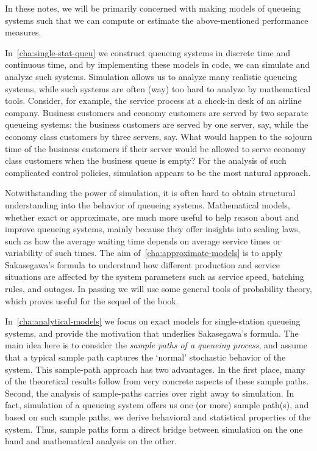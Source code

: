 In these notes, we will be primarily concerned with making models of queueing systems such that we can compute or estimate the above-mentioned performance measures.

In~\cref{cha:single-stat-queu} we construct queueing systems in discrete time and continuous time, and by implementing these models in code, we can simulate and analyze such systems.
Simulation allows us to analyze many realistic queueing systems, while such systems are often (way) too hard to analyze by mathematical tools.
Consider, for example, the service process at a check-in desk of an airline company.
Business customers and economy customers are served by two separate queueing systems: the business customers are served by one server, say, while the economy class customers by three servers, say.
What would happen to the sojourn time of the business customers if their server would be allowed to serve economy class customers when the business queue is empty?
For the analysis of such complicated control policies, simulation appears to be the most natural approach.

Notwithstanding the power of simulation, it is often hard to obtain structural understanding into the behavior of queueing systems.
Mathematical models, whether exact or approximate, are much more useful to help reason about and improve queueing systems, mainly because they offer insights into scaling laws, such as how the average waiting time depends on average service times or variability of such times.
The aim of~\cref{cha:approximate-models} is to apply Sakasegawa's formula to understand how different production and service situations are affected by the system parameters such as service speed, batching rules, and outages.
In passing we will use some general tools of probability theory, which proves useful for the sequel of the book.

In~\cref{cha:analytical-models} we focus on exact models for single-station queueing systems, and provide the motivation that underlies Sakasegawa's formula.
The main idea here is to consider the \emph{sample paths of a queueing process}, and assume that a typical sample path captures the `normal' stochastic behavior of the system.
This sample-path approach has two advantages.
In the first place, many of the theoretical results follow from very concrete aspects of these sample paths.
Second, the analysis of sample-paths carries over right away to simulation.
In fact, simulation of a queueing system offers us one (or more) sample path(s), and based on such sample paths, we derive behavioral and statistical properties of the system.
Thus, sample paths form a direct bridge between simulation on the one hand and mathematical analysis on the other.


